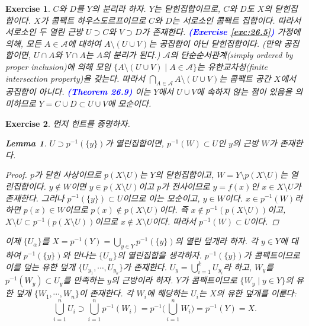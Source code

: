\documentclass{article}
\newtheorem{exercise}{Exercise}[section]
\newtheorem*{lem}{Lemma}
\begin{document}
\begin{exercise}
    $C$와 $D$를 $Y$의 분리라 하자. $Y$는 닫힌집합이므로, $C$와 $D$도 $X$의 닫힌집합이다. $X$가 콤팩트 하우스도르프이므로 $C$와 $D$는 서로소인 콤팩트 집합이다. 따라서 서로소인 두 열린 근방 $U\supset C$와 $V\supset D$가 존재한다. \textcolor{blue}{\textbf{(Exercise \ref{exc:26.5})}} 가정에 의해, 모든 $A\in\mathcal{A}$에 대하여 $A\setminus(U\cup V)$는 공집합이 아닌 닫힌집합이다. (만약 공집합이면, $U\cap A$와 $V\cap A$는 $A$의 분리가 된다.) $\mathcal{A}$의 단순순서관계(simply ordered by proper inclusion)에 의해 모임 $\{A\setminus(U\cup V)\mid A\in\mathcal{A}\}$는 유한교차성(finite intersection property)을 갖는다. 따라서 $\bigcap_{A\in\mathcal{A}}A\setminus(U\cup V)$는 콤팩트 공간 $X$에서 공집합이 아니다. \textcolor{blue}{\textbf{(Theorem 26.9)}} 이는 $Y$에서 $U\cup V$에 속하지 않는 점이 있음을 의미하므로 $Y=C\cup D\subset U\cup V$에 모순이다.
\end{exercise}

\begin{exercise}
	\label{exc:26.12}
    먼저 힌트를 증명하자.
    \begin{lem}
        $U\supset p^{-1}(\{y\})$가 열린집합이면, $p^{-1}(W)\subset U$인 $y$의 근방 $W$가 존재한다.
    \end{lem}
    \begin{proof}
        $p$가 닫힌 사상이므로 $p(X\setminus U)$는 $Y$의 닫힌집합이고, $W=Y\setminus p(X\setminus U)$는 열린집합이다. $y\notin W$이면 $y\in p(X\setminus U)$이고 $p$가 전사이므로 $y=f(x)$인 $x\in X\setminus U$가 존재한다. 그러나 $p^{-1}(\{y\})\subset U$이므로 이는 모순이고, $y\in W$이다. $x\in p^{-1}(W)$라 하면 $p(x)\in W$이므로 $p(x)\notin p(X\setminus U)$이다. 즉 $x\notin p^{-1}(p(X\setminus U))$이고, $X\setminus U\subset p^{-1}(p(X\setminus U))$이므로 $x\notin X\setminus U$이다. 따라서 $p^{-1}(W)\subset U$이다.
    \end{proof}
    \noindent 이제 $\{U_\alpha\}$를 $X=p^{-1}(Y)=\bigcup_{y\in Y}p^{-1}(\{y\})$의 열린 덮개라 하자. 각 $y\in Y$에 대하여 $p^{-1}(\{y\})$와 만나는 $\{U_\alpha\}$의 열린집합을 생각하자. $p^{-1}(\{y\})$가 콤팩트이므로 이를 덮는 유한 덮개 $\{U_{y_1},\cdots,U_{y_k}\}$가 존재한다. $U_y=\bigcup_{i=1}^kU_{y_i}$라 하고, $W_y$를 $p^{-1}(W_y)\subset U_y$를 만족하는 $y$의 근방이라 하자. $Y$가 콤팩트이므로 $\{W_y\mid y\in Y\}$의 유한 덮개 $\{W_1,\cdots, W_n\}$이 존재한다. 각 $W_i$에 해당하는 $U_i$는 $X$의 유한 덮개를 이룬다:
    \[
        \bigcup_{i=1}^nU_i\supset\bigcup_{i=1}^np^{-1}(W_i)=p^{-1}\biggl(\bigcup_{i=1}^nW_i\biggr)=p^{-1}(Y)=X.
    \]
\end{exercise}
\end{document}

